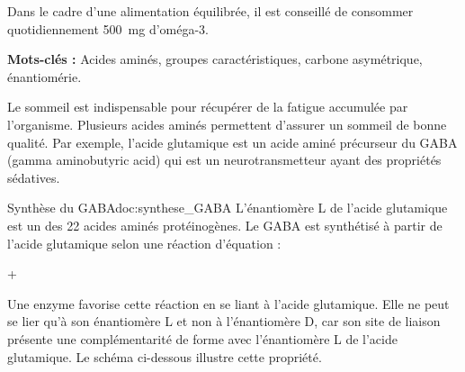 \medskip
Dans le cadre d'une alimentation équilibrée, il est conseillé de consommer quotidiennement
\qty{500}{\mg} d'oméga-3.



\newpage
{}\label{exo:gaba}

\textbf{Mots-clés :} Acides aminés, groupes caractéristiques, carbone asymétrique, énantiomérie.
\medskip

Le sommeil est indispensable pour récupérer de la fatigue accumulée par l'organisme.
Plusieurs acides aminés permettent d'assurer un sommeil de bonne qualité. Par exemple,
l'acide glutamique est un acide aminé précurseur du GABA (gamma aminobutyric acid) qui
est un neurotransmetteur ayant des propriétés sédatives.

\begin{doc}{Synthèse du GABA}{doc:synthese_GABA}
  L'énantiomère L de l'acide glutamique est un des 22 acides aminés protéinogènes. Le
  GABA est synthétisé à partir de l'acide glutamique selon une réaction d'équation :
  \begin{center}
      \reaction
       + 
  \end{center}
  Une enzyme favorise cette réaction en se liant à l'acide glutamique.
  Elle ne peut se lier qu'à son énantiomère L et non à l'énantiomère D,
  car son site de liaison présente une complémentarité de forme avec l'énantiomère L de l'acide glutamique.
  Le schéma ci-dessous illustre cette propriété.
  \begin{center}
  \end{center}
\end{doc}

